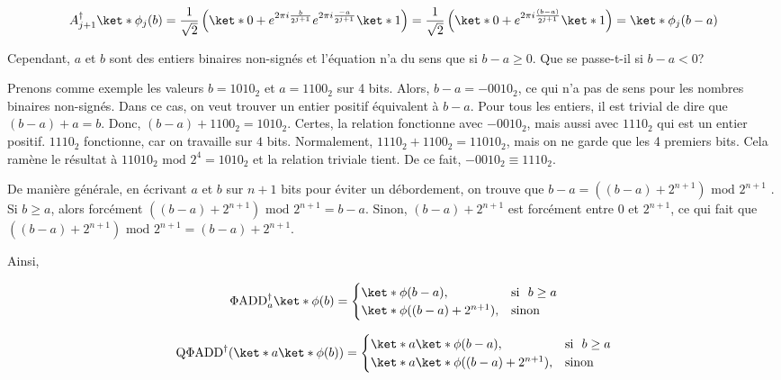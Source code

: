 \begin{equation*}
    A_{j+1}^\dag \ket*{\phi_j(b)}  = \frac{1}{\sqrt{2}} \left(\ket*{0} + e^{2\pi i \frac{b}{2^{j+1}}} e^{2\pi i \frac{-a}{2^{j+1}}} \ket*{1}\right) = \frac{1}{\sqrt{2}} \left(\ket*{0} + e^{2\pi i \frac{(b-a)}{2^{j+1}}} \ket*{1}\right) = \ket*{\phi_j(b-a)}
\end{equation*}

Cependant, $a$ et $b$ sont des entiers binaires non-signés et l'équation n'a du sens que si $b-a \geq 0$. Que se passe-t-il si $b-a < 0$?

Prenons comme exemple les valeurs $b = 1010_2$ et $a = 1100_2$ sur 4 bits. Alors, $b-a = -0010_2$, ce qui n'a pas de sens pour les nombres binaires non-signés. Dans ce cas, on veut trouver un entier positif équivalent à $b-a$.  Pour tous les entiers, il est trivial de dire que $(b-a) + a = b$. Donc, $(b-a) + 1100_2 = 1010_2$. Certes, la relation fonctionne avec $-0010_2$, mais aussi avec $1110_2$ qui est un entier positif. $1110_2$ fonctionne, car on travaille sur $4$ bits. Normalement, $1110_2 + 1100_2 = 11010_2$, mais on ne garde que les 4 premiers bits. Cela ramène le résultat à $11010_2 \text{ mod } 2^4 = 1010_2$ et la relation triviale tient. De ce fait, $-0010_2 \equiv 1110_2$. 

De manière générale, en écrivant $a$ et $b$ sur $n+1$ bits pour éviter un débordement, on trouve que $b-a = ((b-a) + 2^{n+1} ) \text{ mod } 2^{n+1}$ \cite{beauregard2003circuitshorsalgorithmusing}. Si $b \geq a$, alors forcément $((b-a) + 2^{n+1} ) \text{ mod } 2^{n+1} = b-a$. Sinon, $(b-a) + 2^{n+1}$ est forcément entre 0 et $2^{n+1}$, ce qui fait que  $((b-a) + 2^{n+1} ) \text{ mod } 2^{n+1} = (b-a) + 2^{n+1}$.

Ainsi, 

\begin{equation}
    \Phi \text{ADD}_a^\dag \ket*{\phi(b)} = 
    \begin{cases}
        \ket*{\phi(b-a)}, & \text{si \ } b \geq a \\
        \ket*{\phi((b-a) + 2^{n+1})}, & \text{sinon}
    \end{cases}
\end{equation}

\begin{equation}
    \text{Q}\Phi \text{ADD}^\dag (\ket*{a}\ket*{\phi(b)}) = 
    \begin{cases}
        \ket*{a} \ket*{\phi(b-a)}, & \text{si \ } b \geq a \\
        \ket*{a}\ket*{\phi((b-a) + 2^{n+1})}, & \text{sinon}
    \end{cases}
\end{equation}